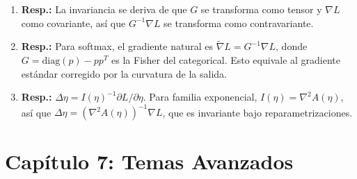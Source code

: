 \begin{enumerate}
	\item \textbf{Resp.:} La invariancia se deriva de que $G$ se transforma como tensor y $\nabla L$ como covariante, así que $G^{-1}\nabla L$ se transforma como contravariante.
	\item \textbf{Resp.:} Para softmax, el gradiente natural es $\tilde{\nabla} L = G^{-1} \nabla L$, donde $G = \text{diag}(p) - pp^T$ es la Fisher del categorical.  Esto equivale al gradiente estándar corregido por la curvatura de la salida.
	\item \textbf{Resp.:} $\Delta\eta = I(\eta)^{-1} \partial L/\partial\eta$.  Para familia exponencial, $I(\eta) = \nabla^2 A(\eta)$, así que $\Delta\eta = (\nabla^2 A(\eta))^{-1} \nabla L$, que es invariante bajo reparametrizaciones.
\end{enumerate}

\section*{Capítulo 7: Temas Avanzados}

